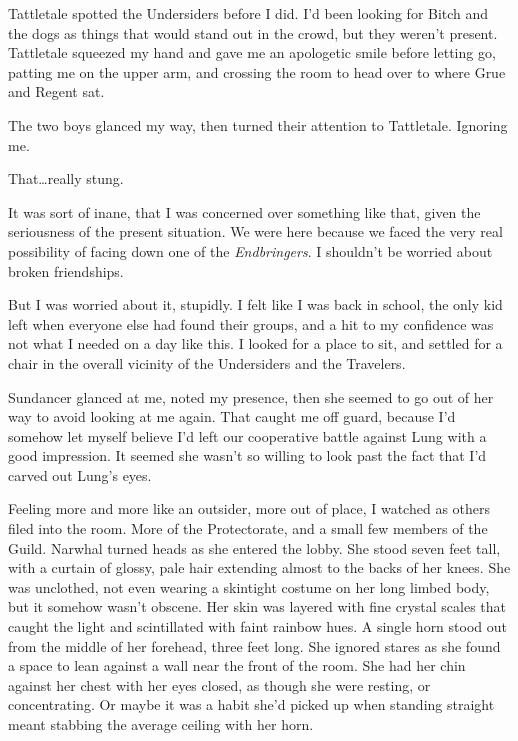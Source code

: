 Tattletale spotted the Undersiders before I did.  I'd been looking for Bitch and the dogs as things that would stand out in the crowd, but they weren't present.  Tattletale squeezed my hand and gave me an apologetic smile before letting go, patting me on the upper arm, and crossing the room to head over to where Grue and Regent sat.



The two boys glanced my way, then turned their attention to Tattletale.  Ignoring me.



That\ldots really stung.



It was sort of inane, that I was concerned over something like that, given the seriousness of the present situation.  We were here because we faced the very real possibility of facing down one of the \emph{Endbringers}.  I shouldn't be worried about broken friendships.



But I was worried about it, stupidly.  I felt like I was back in school, the only kid left when everyone else had found their groups, and a hit to my confidence was not what I needed on a day like this.  I looked for a place to sit, and settled for a chair in the overall vicinity of the Undersiders and the Travelers.



Sundancer glanced at me, noted my presence, then she seemed to go out of her way to avoid looking at me again.  That caught me off guard, because I'd somehow let myself believe I'd left our cooperative battle against Lung with a good impression.  It seemed she wasn't so willing to look past the fact that I'd carved out Lung's eyes.



Feeling more and more like an outsider, more out of place, I watched as others filed into the room.  More of the Protectorate, and a small few members of the Guild.  Narwhal turned heads as she entered the lobby.  She stood seven feet tall, with a curtain of glossy, pale hair extending almost to the backs of her knees.  She was unclothed, not even wearing a skintight costume on her long limbed body, but it somehow wasn't obscene.  Her skin was layered with fine crystal scales that caught the light and scintillated with faint rainbow hues.  A single horn stood out from the middle of her forehead, three feet long.  She ignored stares as she found a space to lean against a wall near the front of the room.  She had her chin against her chest with her eyes closed, as though she were resting, or concentrating.  Or maybe it was a habit she'd picked up when standing straight meant stabbing the average ceiling with her horn.



